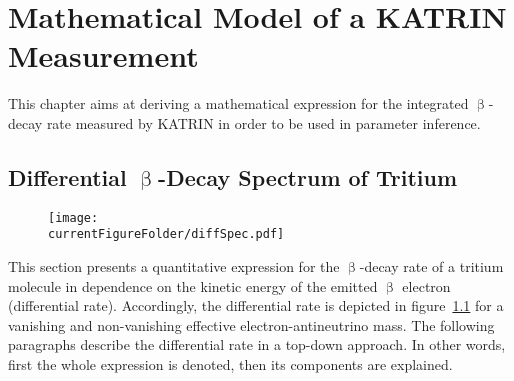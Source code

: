 \def\currentRootFolder{chapter/modelOfIntegratedRate}
\def\currentFigureFolder{\currentRootFolder/fig}



\chapter{Mathematical Model of a KATRIN Measurement}
\label{sec:intSpecModel}
This chapter aims at deriving a mathematical expression for the integrated $\upbeta$-decay rate measured by KATRIN in order to be used in parameter inference.

\section{Differential \texorpdfstring{$\upbeta$}{Beta}-Decay Spectrum of Tritium}
\label{sec:intSpecModelDiffSpec}
\begin{figure}
	\centering
	\texttt{[image: \\currentFigureFolder/diffSpec.pdf]}
	\label{fig:intSpecModelDiffSpec}
\end{figure}


This section presents a quantitative expression for the $\upbeta$-decay rate of a tritium molecule in dependence on the kinetic energy of the emitted $\upbeta$ electron (differential rate). Accordingly, the differential rate is depicted in figure~\ref{fig:intSpecModelDiffSpec} for a vanishing and non-vanishing effective electron-antineutrino mass. The following paragraphs describe the differential rate in a top-down approach. In other words, first the whole expression is denoted, then its components are explained.

